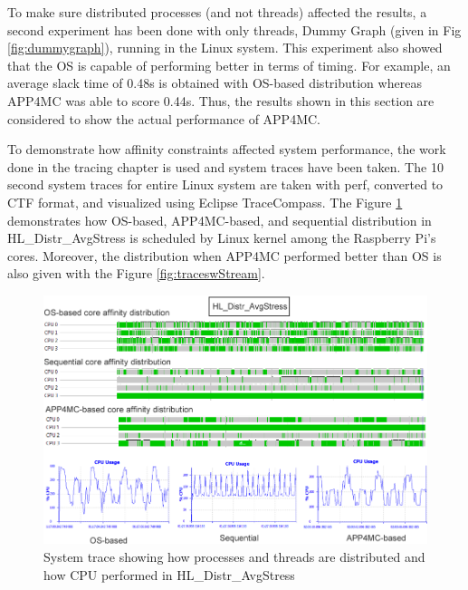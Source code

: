 To make sure distributed processes (and not threads) affected the results, a second experiment has been done with only threads, Dummy Graph (given in Fig \ref{fig:dummygraph}), running in the Linux system. This experiment also showed that the OS is capable of performing better in terms of timing. For example, an average slack time of 0.48s is obtained with OS-based distribution whereas APP4MC was able to score 0.44s. Thus, the results shown in this section are considered to show the actual performance of APP4MC.

To demonstrate how affinity constraints affected system performance, the work done in the tracing chapter is used and system traces have been taken. The 10 second system traces for entire Linux system are taken with perf, converted to CTF format, and visualized using Eclipse TraceCompass. The Figure \ref{fig:tracesAvgStress} demonstrates how OS-based, APP4MC-based, and sequential distribution in HL{\_}Distr{\_}AvgStress is scheduled by Linux kernel among the Raspberry Pi's cores. Moreover, the distribution when APP4MC performed better than OS is also given with the Figure \ref{fig:traceswStream}.

\begin{figure}[!ht]
	\centering
	\includegraphics[width=\textwidth]{content/images/tracesAvgStress.png}
	\caption{System trace showing how processes and threads are distributed and how CPU performed in HL{\_}Distr{\_}AvgStress}
	\label{fig:tracesAvgStress}
\end{figure}

